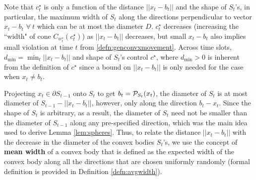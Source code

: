  

\begin{rem}\label{rem:cbound}
Note that $c_t^\star$ is only a function of the distance $ ||x_t-b_t||$   and the shape of $S_t$'s, in particular, the maximum width of $S_t$ 
 along the directions perpendicular to vector $x_t-b_t$ $\forall \ t$ which can be at most the diameter $D$. 
 $c_t^\star$ decreases (increasing the ``width" of cone $C_{w_t^\star}(c_t^\star)$) as $||x_t-b_t||$ decreases, but small $x_t-b_t$ also implies small  violation at time $t$ from \eqref{defn:genconvxmovement}.
Across time slots, $d_{\min} = \min_t ||x_t-b_t||$ and shape of $S_t$'s control $c^\star$, where $d_{\min} > 0$ is inherent from the definition of $c^\star$ since a bound on $||x_t-b_t||$ is only needed for the case when $x_t\ne b_t$. 
\end{rem} 

\begin{rem}  Projecting $x_t\in \partial S_{t-1}$ onto $S_t$ to get $b_t=\mathcal{P}_{S_t}(x_t)$, the diameter of $S_t$ is at most diameter of $S_{t-1} - ||x_t-b_t||$, however, only along the direction $b_t-x_t$. Since the shape of $S_{t}$ is arbitrary, as a result, the diameter of $S_t$ need not be smaller than the diameter of $S_{t-1}$ along any pre-specified direction, which was the main idea used to derive Lemma \ref{lem:spheres}.  Thus, to relate the distance $||x_t-b_t||$ with the decrease in the diameter of the convex bodies $S_t$'s, we use the concept of {\bf mean width} of a convex body that is defined as the expected width of the convex body along all the directions that are chosen uniformly randomly (formal definition is provided in Definition \ref{defn:avgwidth}).
\end{rem}

